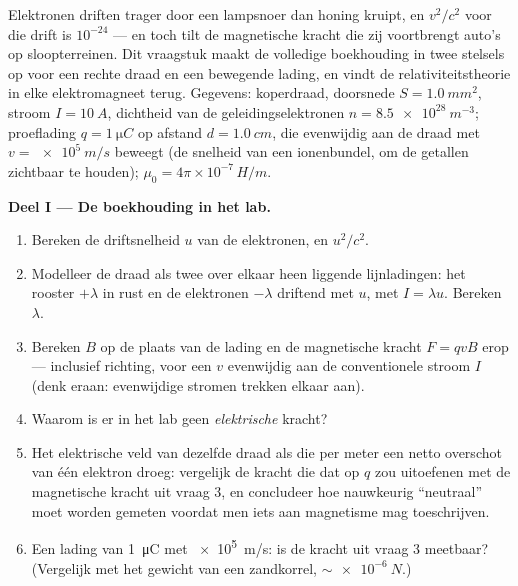 \begin{problem}\label{pb:b3:covariant-electromagnetism:1}
Elektronen driften trager door een lampsnoer dan honing kruipt, en
$v^2/c^2$ voor die drift is $10^{-24}$ --- en toch tilt de magnetische
kracht die zij voortbrengt auto's op sloopterreinen. Dit vraagstuk maakt
de volledige boekhouding in twee stelsels op voor een rechte draad en een
bewegende lading, en vindt de relativiteitstheorie in elke elektromagneet
terug. Gegevens: koperdraad, doorsnede $S = \qty{1.0}{mm^2}$, stroom $I = \qty{10}{A}$, dichtheid van de geleidingselektronen $n = \qty{8.5e28}{m^{-3}}$; proeflading $q = \qty{1}{\micro C}$ op afstand $d = \qty{1.0}{cm}$, die evenwijdig aan de draad met $v = \qty{e5}{m/s}$
beweegt (de snelheid van een ionenbundel, om de getallen zichtbaar te
houden); $\mu_0 = 4\pi\times10^{-7}\,\unit{H/m}$.

\medskip\noindent\textbf{Deel I --- De boekhouding in het lab.}
\begin{enumerate}
  \item Bereken de driftsnelheid $u$ van de elektronen, en $u^2/c^2$.
  \item Modelleer de draad als twee over elkaar heen liggende
        lijnladingen: het rooster $+\lambda$ in rust en de elektronen
        $-\lambda$ driftend met $u$, met $I = \lambda u$. Bereken
        $\lambda$.
  \item Bereken $B$ op de plaats van de lading en de magnetische kracht
        $F = qvB$ erop --- inclusief richting, voor een $v$ evenwijdig
        aan de conventionele stroom $I$ (denk eraan: evenwijdige stromen
        trekken elkaar aan).
  \item Waarom is er in het lab geen \emph{elektrische} kracht?
  \item Het elektrische veld van dezelfde draad als die per meter een
        netto overschot van één elektron droeg: vergelijk de kracht die
        dat op $q$ zou uitoefenen met de magnetische kracht uit vraag 3,
        en concludeer hoe nauwkeurig ``neutraal'' moet worden gemeten
        voordat men iets aan magnetisme mag toeschrijven.
  \item Een lading van \qty{1}{\micro C} met \qty{e5}{m/s}: is de kracht
        uit vraag 3 meetbaar? (Vergelijk met het gewicht van een
        zandkorrel, $\sim\qty{e-6}{N}$.)
\end{enumerate}


\end{problem}
